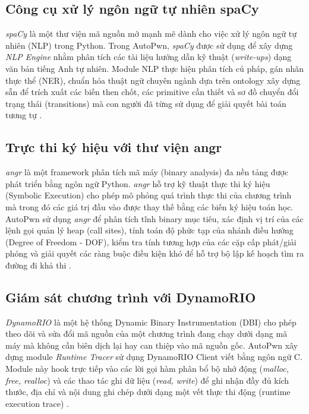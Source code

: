 \documentclass[final]{hcmuitthesis}
\begin{document}
\subsection{Công cụ xử lý ngôn ngữ tự nhiên spaCy}
\textit{spaCy} là một thư viện mã nguồn mở mạnh mẽ dành cho việc xử lý ngôn ngữ tự nhiên (NLP) trong Python. Trong AutoPwn, \textit{spaCy} được sử dụng để xây dựng \textit{NLP Engine} nhằm phân tích các tài liệu hướng dẫn kỹ thuật (\textit{write-ups}) dạng văn bản tiếng Anh tự nhiên. Module NLP thực hiện phân tích cú pháp, gán nhãn thực thể (NER), chuẩn hóa thuật ngữ chuyên ngành dựa trên ontology xây dựng sẵn để trích xuất các biến then chốt, các primitive cần thiết và sơ đồ chuyển đổi trạng thái (transitions) mà con người đã từng sử dụng để giải quyết bài toán tương tự \cite{spacy2025}.

\subsection{Trực thi ký hiệu với thư viện angr}
\textit{angr} là một framework phân tích mã máy (binary analysis) đa nền tảng được phát triển bằng ngôn ngữ Python. \textit{angr} hỗ trợ kỹ thuật thực thi ký hiệu (Symbolic Execution) cho phép mô phỏng quá trình thực thi của chương trình mà trong đó các giá trị đầu vào được thay thế bằng các biến ký hiệu toán học. AutoPwn sử dụng \textit{angr} để phân tích tĩnh binary mục tiêu, xác định vị trí của các lệnh gọi quản lý heap (call sites), tính toán độ phức tạp của nhánh điều hướng (Degree of Freedom - DOF), kiểm tra tính tương hợp của các cặp cấp phát/giải phóng và giải quyết các ràng buộc điều kiện khó để hỗ trợ bộ lập kế hoạch tìm ra đường đi khả thi \cite{angr2025,wang2017angr}.

\subsection{Giám sát chương trình với DynamoRIO}
\textit{DynamoRIO} là một hệ thống Dynamic Binary Instrumentation (DBI) cho phép theo dõi và sửa đổi mã nguồn của một chương trình đang chạy dưới dạng mã máy mà không cần biên dịch lại hay can thiệp vào mã nguồn gốc. AutoPwn xây dựng module \textit{Runtime Tracer} sử dụng DynamoRIO Client viết bằng ngôn ngữ C. Module này hook trực tiếp vào các lời gọi hàm phân bổ bộ nhớ động (\textit{malloc, free, realloc}) và các thao tác ghi dữ liệu (\textit{read, write}) để ghi nhận đầy đủ kích thước, địa chỉ và nội dung ghi chép dưới dạng một vết thực thi động (runtime execution trace) \cite{dynamorio2025,glibc2025}.
\end{document}

